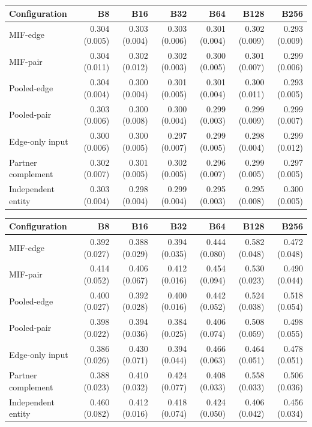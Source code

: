 \begin{tablehere}\scriptsize
\setlength{\tabcolsep}{3pt}
\caption{mpe: structural controls, mean final coverage distance. Mean (sample SD) over five training seeds.}

\begin{tabular}{lrrrrrr}\toprule
Configuration & B8 & B16 & B32 & B64 & B128 & B256 \\\midrule
MIF-edge & 0.304 (0.005) & 0.303 (0.004) & 0.303 (0.006) & 0.301 (0.004) & 0.302 (0.009) & 0.293 (0.009) \\
MIF-pair & 0.304 (0.011) & 0.302 (0.012) & 0.302 (0.003) & 0.300 (0.005) & 0.301 (0.007) & 0.299 (0.006) \\
Pooled-edge & 0.304 (0.004) & 0.300 (0.004) & 0.301 (0.005) & 0.301 (0.004) & 0.300 (0.011) & 0.293 (0.005) \\
Pooled-pair & 0.303 (0.006) & 0.300 (0.008) & 0.300 (0.004) & 0.299 (0.003) & 0.299 (0.009) & 0.299 (0.007) \\
Edge-only input & 0.300 (0.006) & 0.300 (0.005) & 0.297 (0.007) & 0.299 (0.005) & 0.298 (0.004) & 0.299 (0.012) \\
Partner complement & 0.302 (0.007) & 0.301 (0.005) & 0.302 (0.005) & 0.296 (0.007) & 0.299 (0.005) & 0.297 (0.005) \\
Independent entity & 0.303 (0.004) & 0.298 (0.004) & 0.299 (0.004) & 0.295 (0.003) & 0.295 (0.008) & 0.300 (0.005) \\
\bottomrule\end{tabular}
\end{tablehere}

\begin{tablehere}\scriptsize
\setlength{\tabcolsep}{3pt}
\caption{mpe: structural controls, mean collisions. Mean (sample SD) over five training seeds.}

\begin{tabular}{lrrrrrr}\toprule
Configuration & B8 & B16 & B32 & B64 & B128 & B256 \\\midrule
MIF-edge & 0.392 (0.027) & 0.388 (0.029) & 0.394 (0.035) & 0.444 (0.080) & 0.582 (0.048) & 0.472 (0.048) \\
MIF-pair & 0.414 (0.052) & 0.406 (0.067) & 0.412 (0.016) & 0.454 (0.094) & 0.530 (0.023) & 0.490 (0.044) \\
Pooled-edge & 0.400 (0.027) & 0.392 (0.028) & 0.400 (0.016) & 0.442 (0.052) & 0.524 (0.038) & 0.518 (0.054) \\
Pooled-pair & 0.398 (0.022) & 0.394 (0.036) & 0.384 (0.025) & 0.406 (0.074) & 0.508 (0.059) & 0.498 (0.055) \\
Edge-only input & 0.386 (0.026) & 0.430 (0.071) & 0.394 (0.044) & 0.466 (0.063) & 0.464 (0.051) & 0.478 (0.051) \\
Partner complement & 0.388 (0.023) & 0.410 (0.032) & 0.424 (0.077) & 0.408 (0.033) & 0.558 (0.033) & 0.506 (0.036) \\
Independent entity & 0.460 (0.082) & 0.412 (0.016) & 0.418 (0.074) & 0.424 (0.050) & 0.406 (0.042) & 0.456 (0.034) \\
\bottomrule\end{tabular}
\end{tablehere}

